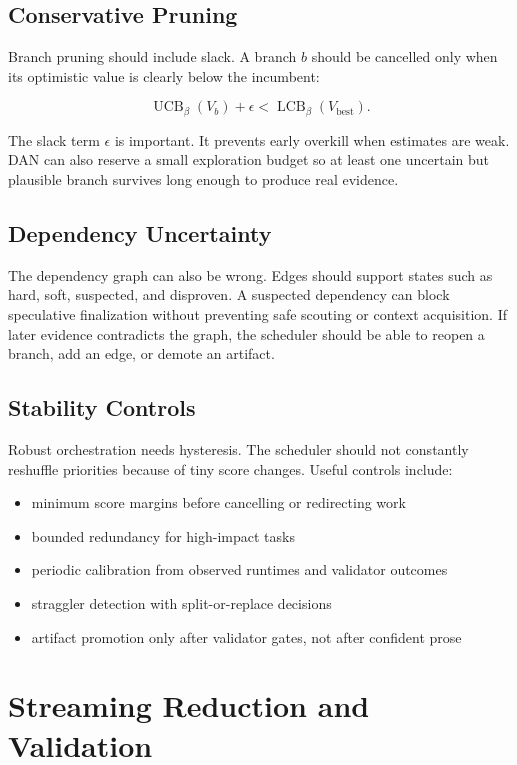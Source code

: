 \documentclass[11pt]{article}
\newcommand{\UCB}{\operatorname{UCB}}
\newcommand{\LCB}{\operatorname{LCB}}
\begin{document}
\subsection{Conservative Pruning}

Branch pruning should include slack. A branch $b$ should be cancelled only when its optimistic value is clearly below the incumbent:

\[
\UCB_\beta(V_b) + \epsilon
<
\LCB_\beta(V_{\text{best}}).
\]

The slack term $\epsilon$ is important. It prevents early overkill when estimates are weak. DAN can also reserve a small exploration budget so at least one uncertain but plausible branch survives long enough to produce real evidence.

\subsection{Dependency Uncertainty}

The dependency graph can also be wrong. Edges should support states such as hard, soft, suspected, and disproven. A suspected dependency can block speculative finalization without preventing safe scouting or context acquisition. If later evidence contradicts the graph, the scheduler should be able to reopen a branch, add an edge, or demote an artifact.

\subsection{Stability Controls}

Robust orchestration needs hysteresis. The scheduler should not constantly reshuffle priorities because of tiny score changes. Useful controls include:

\begin{itemize}[leftmargin=1.5em]
\item minimum score margins before cancelling or redirecting work
\item bounded redundancy for high-impact tasks
\item periodic calibration from observed runtimes and validator outcomes
\item straggler detection with split-or-replace decisions
\item artifact promotion only after validator gates, not after confident prose
\end{itemize}

\section{Streaming Reduction and Validation}
\end{document}
